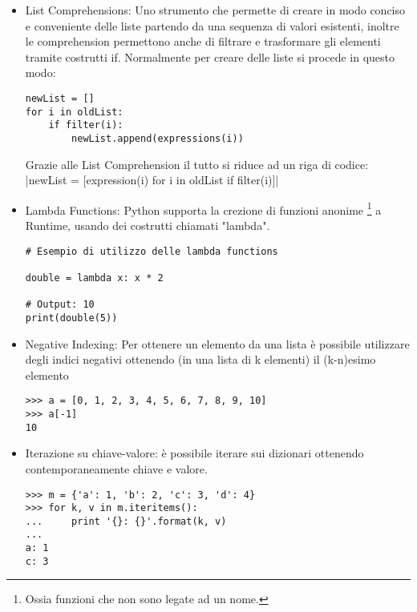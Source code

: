 \begin{itemize}
\item List Comprehensions: Uno strumento che permette di creare in modo conciso e conveniente delle liste partendo da una sequenza di valori esistenti, inoltre le comprehension permettono anche di filtrare e trasformare gli elementi tramite costrutti if.
Normalmente per creare delle liste si procede in questo modo:
\begin{listing}[H]
\begin{verbatim}
newList = []
for i in oldList:
    if filter(i):
        newList.append(expressions(i))
\end{verbatim}
\end{listing}

Grazie alle List Comprehension il tutto si riduce ad un riga di codice:
|newList = [expression(i) for i in oldList if filter(i)]|

\item Lambda Functions: Python supporta la crezione di funzioni anonime \footnote{Ossia funzioni che non sono legate ad un nome.} a Runtime, usando dei costrutti chiamati "lambda".  
\begin{listing}[H]
\begin{verbatim}
# Esempio di utilizzo delle lambda functions

double = lambda x: x * 2

# Output: 10
print(double(5))
\end{verbatim}
\end{listing}
\item Negative Indexing: Per ottenere un elemento da una lista è possibile utilizzare degli indici negativi ottenendo (in una lista di k elementi) il (k-n)esimo elemento
\begin{listing}[H]
\begin{verbatim}
>>> a = [0, 1, 2, 3, 4, 5, 6, 7, 8, 9, 10]
>>> a[-1]
10
\end{verbatim}
\end{listing}
\item Iterazione su chiave-valore: è possibile iterare sui dizionari ottenendo contemporaneamente chiave e valore.
\begin{listing}[H]
\begin{verbatim}
>>> m = {'a': 1, 'b': 2, 'c': 3, 'd': 4}
>>> for k, v in m.iteritems():
...     print '{}: {}'.format(k, v)
...
a: 1
c: 3
\end{verbatim}
\end{listing}

\end{itemize}

